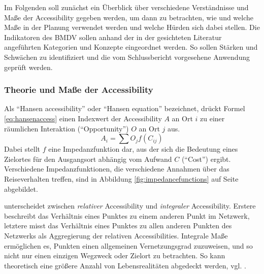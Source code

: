 \documentclass[11pt,pdftex,a4paper]{scrartcl}
\begin{document}
	Im Folgenden soll zunächst ein Überblick über verschiedene Verständnisse und Maße der Accessibility gegeben werden, um dann zu betrachten, wie und welche Maße in der Planung verwendet werden und welche Hürden sich dabei stellen. Die Indikatoren des BMDV sollen anhand der in der gesichteten Literatur angeführten Kategorien und Konzepte eingeordnet werden. So sollen Stärken und Schwächen zu identifiziert und die vom Schlussbericht vorgesehene Anwendung geprüft werden.
	
	\subsubsection{Theorie und Maße der Accessibility}
	\label{sec:TheorieundMaßederAccessibility}
	Als \enquote{Hansen accessibility} \parencite[18]{harrisAccessibilityConceptsApplications2001} oder \enquote{Hansen equation} \parencite[46]{levinsonTransportAccessManual2020} bezeichnet, drückt Formel \ref{eq:hansenaccess} einen Indexwert der Accessibility $A$ an Ort $i$ zu einer räumlichen Interaktion (\enquote{Opportunity}) $O$ an Ort $j$ aus.
	\begin{equation}
		\label{eq:hansenaccess}
		A_i = \sum{O_j f(C_{ij})}
	\end{equation}
	Dabei stellt $f$ eine Impedanzfunktion dar, aus der sich die Bedeutung eines Zielortes für den Ausgangsort abhängig vom Aufwand $C$ (\enquote{Cost}) ergibt. Verschiedene Impedanzfunktionen, die verschiedene Annahmen über das Reiseverhalten treffen, sind in Abbildung \ref{fig:impedancefunctions} auf Seite \pageref{fig:impedancefunctions} abgebildet.

	\textcite[101]{ingramConceptAccessibilitySearch1971} unterscheidet zwischen \textit{relativer} Accessibility und \textit{integraler} Accessibility. Erstere beschreibt das Verhältnis eines Punktes zu einem anderen Punkt im Netzwerk, letztere misst das Verhältnis eines Punktes zu allen anderen Punkten des Netzwerks als Aggregierung der relativen Accessibilities. Integrale Maße ermöglichen es, Punkten einen allgemeinen Vernetzungsgrad zuzuweisen, und so nicht nur einen einzigen Wegzweck oder Zielort zu betrachten. So kann theoretisch eine größere Anzahl von Lebensrealitäten abgedeckt werden, vgl. \textcites[192, Fußnote 2]{kwanSpaceTimeIntegralMeasures1998} [94]{morrisAccessibilityIndicatorsTransport1979}.
	
\end{document}
